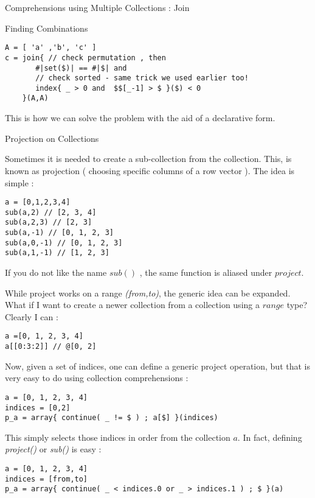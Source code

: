 \begin{section}{Comprehensions using Multiple Collections : Join}
\begin{subsection}{Finding Combinations}
\begin{lstlisting}[style=JexlStyle]
A = [ 'a' ,'b', 'c' ] 
c = join{ // check permutation , then 
       #|set($)| == #|$| and 
       // check sorted - same trick we used earlier too!      
       index{ _ > 0 and  $$[_-1] > $ }($) < 0 
    }(A,A)
\end{lstlisting}
This is how we can solve the problem with the aid of a declarative form. 
\end{subsection}

\begin{subsection}{Projection on Collections}

Sometimes it is needed to create a sub-collection from the collection. 
This, is known as projection ( choosing specific columns of a row vector ).
The idea is simple :

\begin{lstlisting}[style=JexlStyle]
a = [0,1,2,3,4]
sub(a,2) // [2, 3, 4]
sub(a,2,3) // [2, 3]
sub(a,-1) // [0, 1, 2, 3]
sub(a,0,-1) // [0, 1, 2, 3]
sub(a,1,-1) // [1, 2, 3]
\end{lstlisting}
If you do not like the name $sub()$ , the same function is aliased under $project$.

While project works on a range \emph{(from,to)}, the generic idea can be expanded. 
What if I want to create a newer collection from a collection using a $range$ type? 
Clearly I can : 

\begin{lstlisting}[style=JexlStyle]
a =[0, 1, 2, 3, 4]
a[[0:3:2]] // @[0, 2]
\end{lstlisting}

Now, given a set of indices, one can define a generic project operation, 
but that is very easy to do using collection comprehensions :

\begin{lstlisting}[style=JexlStyle]
a = [0, 1, 2, 3, 4]
indices = [0,2]
p_a = array{ continue( _ != $ ) ; a[$] }(indices)  
\end{lstlisting}
This simply selects those indices in order from the collection $a$.
In fact, defining \emph{project()} or \emph{sub()} is easy :

\begin{lstlisting}[style=JexlStyle]
a = [0, 1, 2, 3, 4]
indices = [from,to]
p_a = array{ continue( _ < indices.0 or _ > indices.1 ) ; $ }(a)  
\end{lstlisting}

\end{subsection}

\end{section}

